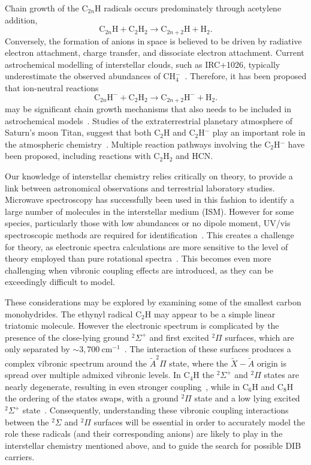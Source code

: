 \documentclass[journal=jpcafh,manuscript=article,layout=onecolumn, 12pt]{achemso}
\begin{document}
Chain growth of the C$_{2n}$H radicals occurs predominately through acetylene addition,
\begin{equation}
\text{C}_{2n}\text{H} + \text{C}_2\text{H}_2 \rightarrow \text{C}_{2n+2}\text{H}+\text{H}_2.
\end{equation}
Conversely, the formation of anions in space is believed to be driven by radiative electron attachment, charge transfer, and dissociate electron attachment. Current astrochemical modelling of interstellar clouds, such as IRC+1026, typically underestimate the observed abundances of CH$_4^-$~\cite{mil17,cor13,her08}. Therefore, it has been proposed that ion-neutral reactions
 \begin{equation}
	\text{C}_{2n}\text{H}^- + \text{C}_2\text{H}_2 \rightarrow \text{C}_{2n+2}\text{H}^- + \text{H}_2.
\end{equation}
may be significant chain growth mechanisms that also needs to be included in astrochemical models~\cite{mil17,bas19}. Studies of the extraterrestrial planetary atmosphere of Saturn's moon Titan, suggest that both C$_2$H and C$_2$H$^-$ play an important role in the atmospheric chemistry~\cite{dob16,vui09,des17,vri18}. Multiple reaction pathways involving the C$_2$H$^-$ have been proposed, including reactions with C$_2$H$_2$ and HCN. 

Our knowledge of interstellar chemistry relies critically on theory, to provide a link between astronomical observations and terrestrial laboratory studies. Microwave spectroscopy has successfully been used in this fashion to identify a large number of molecules in the interstellar medium (ISM). However for some species, particularly those with low abundances or no dipole moment, UV/vis spectroscopic methods are required for identification~\cite{mai97}. This creates a challenge for theory, as electronic spectra calculations are more sensitive to the level of theory employed than pure rotational spectra~\cite{for10}. This becomes even more challenging when vibronic coupling effects are introduced, as they can be exceedingly difficult to model.

These considerations may be explored by examining some of the smallest carbon monohydrides. The ethynyl radical C$_2$H may appear to be a simple linear triatomic molecule. However the electronic spectrum is complicated by the presence of the close-lying ground $^2\Sigma^+$ and first excited $^2\Pi$ surfaces, which are only separated by $\sim3,700~$cm$^{-1}$~\cite{cur85,tar03}. The interaction of these surfaces produces a complex vibronic spectrum around the $\tilde{A}^2\Pi$ state, where the $\tilde{X}-\tilde{A}$ origin is spread over multiple admixed vibronic levels. In C$_4$H the $^2\Sigma^+$ and $^2\Pi$ states are nearly degenerate, resulting in even stronger coupling~\cite{zho07}, while in C$_6$H and C$_8$H the ordering of the states swaps, with a ground $^2\Pi$ state and a low lying excited $^2\Sigma^+$ state~\cite{lin99,tay98}. Consequently, understanding these vibronic coupling interactions between the $^2\Sigma$ and $^2\Pi$ surfaces will be essential in order to accurately model the role these radicals (and their corresponding anions) are likely to play in the interstellar chemistry mentioned above, and to guide the search for possible DIB carriers.
\end{document}
